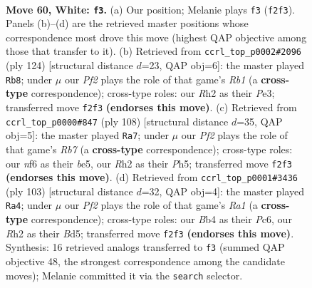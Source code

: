 \documentclass[11pt]{article}
\begin{document}
\clearpage

\begin{figure}[p]\centering
\begin{subfigure}{0.46\textwidth}\centering
\resizebox{\linewidth}{!}{%
\newchessgame
\chessboard[
  setfen={6k1/5p2/5n2/3r4/pB3K1p/P6P/5P1R/8 w - - 3 60},
  showmover=false,
  pgfstyle=straightmove, color=movearrow, markmove={f2-f3}
]}
\caption{}
\end{subfigure}\hfill
\begin{subfigure}{0.46\textwidth}\centering
\resizebox{\linewidth}{!}{%
\newchessgame
\chessboard[
  setfen={8/8/3r1p2/k1p2Bp1/2n3P1/4P3/5P2/1R2K3 w - - 8 63},
  showmover=false,
  pgfstyle=straightmove, color=movearrow, markmove={b1-b8}
]}
\caption{}
\end{subfigure}
\\[4pt]
\begin{subfigure}{0.46\textwidth}\centering
\resizebox{\linewidth}{!}{%
\newchessgame
\chessboard[
  setfen={5k2/1R1B1p2/3p4/4b1pP/1K2P1P1/8/8/2r5 w - - 25 55},
  showmover=false,
  pgfstyle=straightmove, color=movearrow, markmove={b7-a7}
]}
\caption{}
\end{subfigure}\hfill
\begin{subfigure}{0.46\textwidth}\centering
\resizebox{\linewidth}{!}{%
\newchessgame
\chessboard[
  setfen={r5k1/1p3p2/2p2P2/3bPN2/1b6/4K3/7R/1B6 b - - 8 52},
  showmover=false,
  pgfstyle=straightmove, color=movearrow, markmove={a8-a4}
]}
\caption{}
\end{subfigure}
\caption{\textbf{Move 60, White: \texttt{f3}.} (a) Our position; Melanie plays \texttt{f3} (\texttt{f2f3}). Panels (b)--(d) are the retrieved master positions whose correspondence most drove this move (highest QAP objective among those that transfer to it). (b) Retrieved from \texttt{ccrl\_top\_p0002\#2096} (ply 124) [structural distance $d$=23, QAP obj=6]: the master played \texttt{Rb8}; under $\mu$ our \emph{Pf2} plays the role of that game's \emph{Rb1} (a \textbf{cross-type} correspondence); cross-type roles: our \emph{R}h2 as their \emph{P}e3; transferred move \texttt{f2f3} \textbf{(endorses this move)}. (c) Retrieved from \texttt{ccrl\_top\_p0000\#847} (ply 108) [structural distance $d$=35, QAP obj=5]: the master played \texttt{Ra7}; under $\mu$ our \emph{Pf2} plays the role of that game's \emph{Rb7} (a \textbf{cross-type} correspondence); cross-type roles: our \emph{n}f6 as their \emph{b}e5, our \emph{R}h2 as their \emph{P}h5; transferred move \texttt{f2f3} \textbf{(endorses this move)}. (d) Retrieved from \texttt{ccrl\_top\_p0001\#3436} (ply 103) [structural distance $d$=32, QAP obj=4]: the master played \texttt{Ra4}; under $\mu$ our \emph{Pf2} plays the role of that game's \emph{Ra1} (a \textbf{cross-type} correspondence); cross-type roles: our \emph{B}b4 as their \emph{P}c6, our \emph{R}h2 as their \emph{B}d5; transferred move \texttt{f2f3} \textbf{(endorses this move)}. Synthesis: 16 retrieved analogs transferred to \texttt{f3} (summed QAP objective 48, the strongest correspondence among the candidate moves); Melanie committed it via the \texttt{search} selector.}
\label{fig:thought-m118}
\end{figure}
\end{document}
